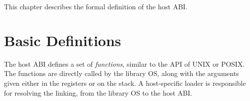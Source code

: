 This chapter describes the formal definition of the \graphene{} host ABI.

\section{Basic Definitions}

The \graphene{} host ABI defines a set of {\em functions}, similar to the API of UNIX or POSIX.
The functions are directly called by the library OS, along with the arguments given either in the registers or on the stack.
A host-specific \graphene{} loader is responsible for resolving the linking, from the library OS to the host ABI.